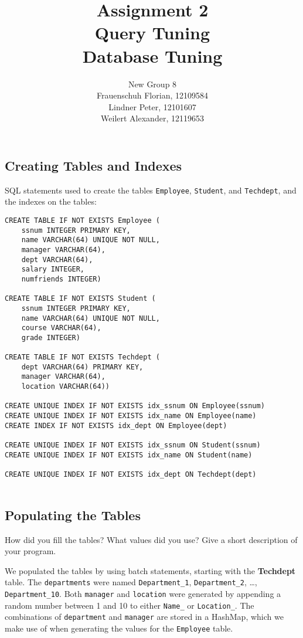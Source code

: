 \documentclass[11pt]{scrartcl}
\title{
    \textbf{\large Assignment 2} \\
    Query Tuning \\
    {\large Database Tuning}
}
\author{
    New Group 8 \\
    \large Frauenschuh Florian, 12109584 \\
    \large Lindner Peter, 12101607 \\
    \large Weilert Alexander, 12119653
}
\begin{document}
    \maketitle\thispagestyle{empty}

    \subsection*{Creating Tables and Indexes}

    SQL statements used to create the tables \texttt{Employee}, \texttt{Student}, and \texttt{Techdept}, and the indexes on the tables:

    \begin{lstlisting}[style=dbtsql]
CREATE TABLE IF NOT EXISTS Employee (
    ssnum INTEGER PRIMARY KEY, 
    name VARCHAR(64) UNIQUE NOT NULL, 
    manager VARCHAR(64), 
    dept VARCHAR(64), 
    salary INTEGER, 
    numfriends INTEGER)

CREATE TABLE IF NOT EXISTS Student (
    ssnum INTEGER PRIMARY KEY, 
    name VARCHAR(64) UNIQUE NOT NULL,
    course VARCHAR(64), 
    grade INTEGER)

CREATE TABLE IF NOT EXISTS Techdept (
    dept VARCHAR(64) PRIMARY KEY, 
    manager VARCHAR(64), 
    location VARCHAR(64))

CREATE UNIQUE INDEX IF NOT EXISTS idx_ssnum ON Employee(ssnum)
CREATE UNIQUE INDEX IF NOT EXISTS idx_name ON Employee(name)
CREATE INDEX IF NOT EXISTS idx_dept ON Employee(dept)

CREATE UNIQUE INDEX IF NOT EXISTS idx_ssnum ON Student(ssnum)
CREATE UNIQUE INDEX IF NOT EXISTS idx_name ON Student(name)

CREATE UNIQUE INDEX IF NOT EXISTS idx_dept ON Techdept(dept)


    \end{lstlisting}

    \subsection*{Populating the Tables}

    How did you fill the tables? What values did you use? Give a short description of your program.

    We populated the tables by using batch statements, starting with the \textbf{Techdept} table.
    The \texttt{departments} were named \texttt{Department\_1}, \texttt{Department\_2}, \dots, \texttt{Department\_10}. Both \texttt{manager} and \texttt{location} were generated by appending a random number between 1 and 10 to either \texttt{Name\_} or \texttt{Location\_}. The combinations of \texttt{department} and \texttt{manager} are stored in a HashMap, which we make use of when generating the values for the \texttt{Employee} table.
\end{document}
